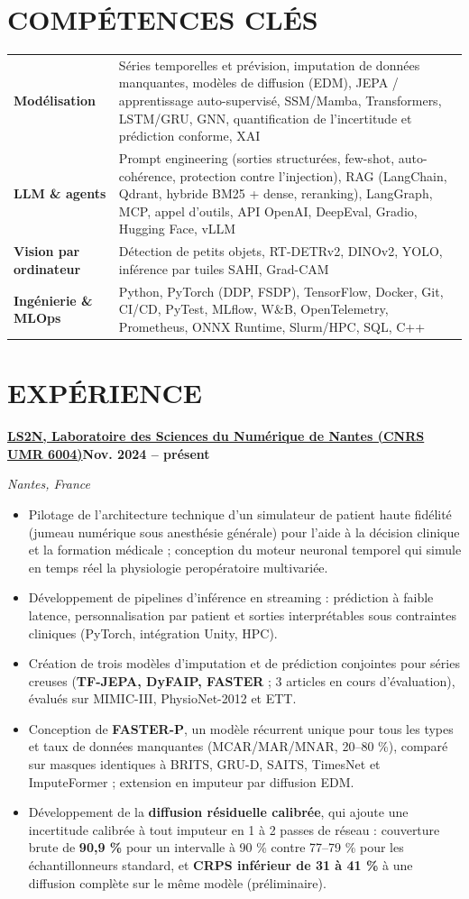 \documentclass[10pt,a4paper]{article}
\newenvironment{cvitems}{\begin{itemize}[leftmargin=11pt,itemsep=0.5pt,topsep=1pt,parsep=0pt,label={\color{accent}\scriptsize$\blacktriangleright$}]\small}{\end{itemize}\vspace{2pt}}
\newcommand{\cvjob}[4]{%
  \noindent\textbf{#1}\hfill{\small\bfseries\textcolor{accent}{#2}}\par
  \noindent{\small\itshape\textcolor{muted}{#3}}\hfill{\small\itshape\textcolor{muted}{#4}}\par}
\newcommand{\cvskill}[2]{\textbf{#1} & #2\\[1.2pt]}
\begin{document}
\section{COMPÉTENCES CLÉS}
{\small
\begin{tabularx}{\linewidth}{@{}p{38mm}X@{}}
  \cvskill{Modélisation}{Séries temporelles et prévision, imputation de données manquantes, modèles de diffusion (EDM), JEPA / apprentissage auto-supervisé, SSM/Mamba, Transformers, LSTM/GRU, GNN, quantification de l’incertitude et prédiction conforme, XAI}
  \cvskill{LLM \& agents}{Prompt engineering (sorties structurées, few-shot, auto-cohérence, protection contre l’injection), RAG (LangChain, Qdrant, hybride BM25 + dense, reranking), LangGraph, MCP, appel d’outils, API OpenAI, DeepEval, Gradio, Hugging Face, vLLM}
  \cvskill{Vision par ordinateur}{Détection de petits objets, RT-DETRv2, DINOv2, YOLO, inférence par tuiles SAHI, Grad-CAM}
  \cvskill{Ingénierie \& MLOps}{Python, PyTorch (DDP, FSDP), TensorFlow, Docker, Git, CI/CD, PyTest, MLflow, W\&B, OpenTelemetry, Prometheus, ONNX Runtime, Slurm/HPC, SQL, C++}
\end{tabularx}}

\section{EXPÉRIENCE}
\cvjob{\href{https://www.ls2n.fr/}{LS2N, Laboratoire des Sciences du Numérique de Nantes (CNRS UMR 6004)}}{Nov. 2024 – présent}{Chercheur post-doctoral, IA pour séries temporelles cliniques et jumeaux numériques de patients}{Nantes, France}
\begin{cvitems}
  \item Pilotage de l’architecture technique d’un simulateur de patient haute fidélité (jumeau numérique sous anesthésie générale) pour l’aide à la décision clinique et la formation médicale ; conception du moteur neuronal temporel qui simule en temps réel la physiologie peropératoire multivariée.
  \item Développement de pipelines d’inférence en streaming : prédiction à faible latence, personnalisation par patient et sorties interprétables sous contraintes cliniques (PyTorch, intégration Unity, HPC).
  \item Création de trois modèles d’imputation et de prédiction conjointes pour séries creuses (\textbf{TF-JEPA, DyFAIP, FASTER} ; 3 articles en cours d’évaluation), évalués sur MIMIC-III, PhysioNet-2012 et ETT.
  \item Conception de \textbf{FASTER-P}, un modèle récurrent unique pour tous les types et taux de données manquantes (MCAR/MAR/MNAR, 20–80 \%), comparé sur masques identiques à BRITS, GRU-D, SAITS, TimesNet et ImputeFormer ; extension en imputeur par diffusion EDM.
  \item Développement de la \textbf{diffusion résiduelle calibrée}, qui ajoute une incertitude calibrée à tout imputeur en 1 à 2 passes de réseau : couverture brute de \textbf{90,9 \%} pour un intervalle à 90 \% contre 77–79 \% pour les échantillonneurs standard, et \textbf{CRPS inférieur de 31 à 41 \%} à une diffusion complète sur le même modèle (préliminaire).
\end{cvitems}
\end{document}
